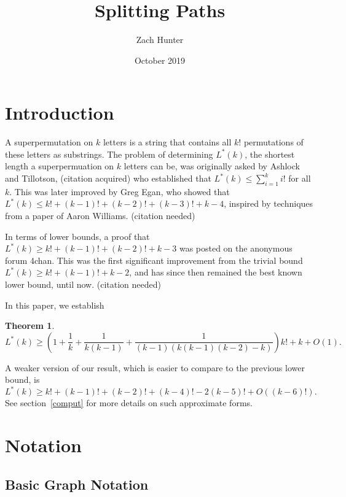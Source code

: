 \documentclass{article}
\title{Splitting Paths}
\author{Zach Hunter}
\date{October 2019}
\newtheorem{thm}{Theorem}
\theoremstyle{definition}
\newcommand{\hide}[1]{}
\newcommand{\dc}[1]{\textcolor{orange}{dc: #1}}
\begin{document}
\maketitle

\section{Introduction}

A superpermutation on $k$ letters is a string that contains all $k!$ permutations of these letters as substrings. The problem of determining $L^*(k)$, the shortest length a superpermuation on $k$ letters can be, was originally asked by  Ashlock and Tillotson, (citation acquired)\hide{(Daniel A. Ashlock and Jenett Tillotson. Construction of small superpermutations
and minimal injective superstrings. Congressus Numerantium,
93:91–98, 1993.)\dc{ use a ref command and bibliography package (see AMT papers, I don't remember all the syntax)}} who established that $L^*(k) \leq \sum_{i=1}^k i!$ for all $k$. This was later improved by Greg Egan, who showed that $L^*(k) \leq k!+(k-1)!+(k-2)!+(k-3)!+k-4$, inspired by techniques from a paper of Aaron Williams. (citation needed)

In terms of lower bounds, a proof that $L^*(k) \geq k! + (k-1)!+(k-2)! +k-3$ was posted on the anonymous forum 4chan. This was the first significant improvement from the trivial bound $L^*(k) \geq k! +(k-1)!+k-2$, and has since then remained the best known lower bound, until now. (citation needed)

In this paper, we establish 

\begin{thm} \label{thm1v1}
\[L^*(k) \ge \left(1+ \frac{1}{k} + \frac{1}{k(k-1)} + \frac{1}{(k-1)(k(k-1)(k-2)-k)}\right)k! +k+O(1).\]\end{thm}A weaker version of our result, which is easier to compare to the previous lower bound, is
\[L^*(k) \geq k!+(k-1)!+(k-2)!+(k-4)!-2(k-5)! +O((k-6)!).\]
See section~\ref{comput} for more details on such approximate forms.


\section{Notation}

\subsection{Basic Graph Notation}
\end{document}
